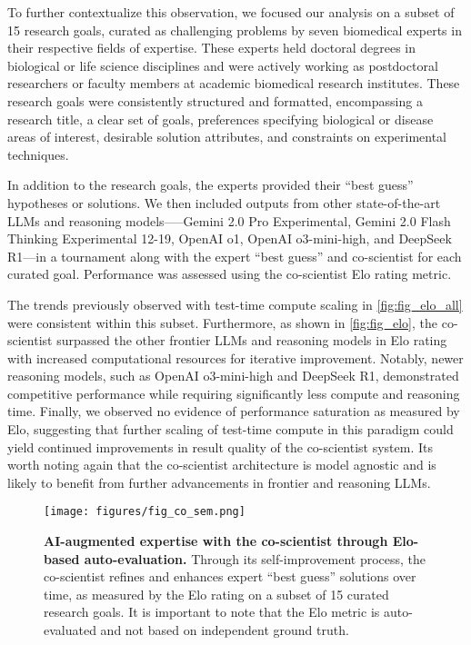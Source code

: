To further contextualize this observation, we focused our analysis on a subset of 15 research goals, curated as challenging problems by seven biomedical experts in their respective fields of expertise. These experts held doctoral degrees in biological or life science disciplines and were actively working as postdoctoral researchers or faculty members at academic biomedical research institutes. These research goals were consistently structured and formatted, encompassing a research title, a clear set of goals, preferences specifying biological or disease areas of interest, desirable solution attributes, and constraints on experimental techniques.

In addition to the research goals, the experts provided their ``best guess'' hypotheses or solutions. We then included outputs from other state-of-the-art LLMs and reasoning models—--Gemini 2.0 Pro Experimental, Gemini 2.0 Flash Thinking Experimental 12-19, OpenAI o1, OpenAI o3-mini-high, and DeepSeek R1—in a tournament along with the expert ``best guess'' and co-scientist for each curated goal. Performance was assessed using the co-scientist Elo rating metric.

The trends previously observed with test-time compute scaling in \cref{fig:fig_elo_all} were consistent within this subset. Furthermore, as shown in \cref{fig:fig_elo}, the co-scientist surpassed the other frontier LLMs and reasoning models in Elo rating with increased computational resources for iterative improvement. Notably, newer reasoning models, such as OpenAI o3-mini-high and DeepSeek R1, demonstrated competitive performance while requiring significantly less compute and reasoning time. Finally, we observed no evidence of performance saturation as measured by Elo, suggesting that further scaling of test-time compute in this paradigm could yield continued improvements in result quality of the co-scientist system. Its worth noting again that the co-scientist architecture is model agnostic and is likely to benefit from further advancements in frontier and reasoning LLMs.

\begin{figure}[htbp!]
\centering
\texttt{[image: figures/fig\_co\_sem.png]}
\vspace{0.1cm}
\caption{\textbf{AI-augmented expertise with the co-scientist through Elo-based auto-evaluation.} Through its self-improvement process, the co-scientist refines and enhances expert ``best guess'' solutions over time, as measured by the Elo rating on a subset of 15 curated research goals. It is important to note that the Elo metric is auto-evaluated and not based on independent ground truth.}
\label{fig:fig_co}
\end{figure}

